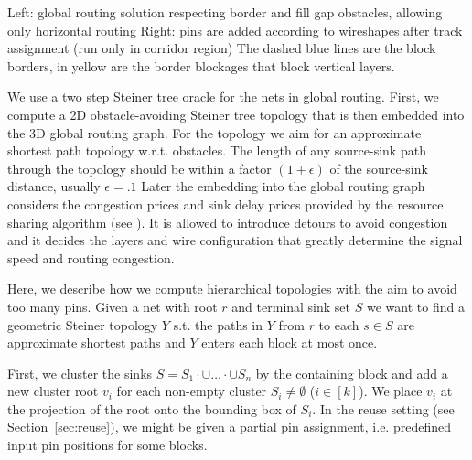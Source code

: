 \documentclass[a2paper]{bigsposter}
\begin{document}
\begin{blockrow}[3]
 {\footnotesize \begin{spacing}{0.9}
 		Left: global routing solution respecting border and fill gap obstacles, allowing only horizontal routing
 		Right: pins are added according to wireshapes after track assignment (run only in corridor region)
 		The dashed blue lines are the block borders, in yellow are the border blockages that block vertical layers.
 	\end{spacing}	}
 
 	
	\blockbreak
	We use a two step Steiner tree oracle for the nets in  global routing.
	First, we compute a 2D obstacle-avoiding Steiner tree topology  that is then embedded into the 3D global routing graph.
	For the topology  we aim  for an approximate shortest path topology w.r.t. obstacles. The length of any source-sink path through the topology
	should be within a factor $(1+\epsilon)$ of the source-sink distance, usually $\epsilon=.1$ 
	Later the embedding into the global routing graph considers the congestion prices and sink delay prices provided by the resource sharing algorithm (see \cite{BRGTiming2}).
	It is allowed to  introduce detours to avoid congestion and it decides the  layers and wire configuration that greatly determine the signal speed and routing congestion.
	
	Here, we describe how we compute hierarchical topologies with the aim to avoid too many pins.
	Given  a net with root $r$ and terminal sink set $S$ we want to find a geometric Steiner topology $Y$ s.t.
	the paths in $Y$ from $r$ to each $s\in S$  are  approximate shortest paths and $Y$ enters each block at most once.
	
	First, we cluster the sinks $S = S_1\cdot{\cup}\dots\cdot{\cup} S_n$ by the containing block and add a new cluster root $v_i$ for each non-empty cluster $S_i \neq\emptyset$ ($i\in [k]$).
	We place  $v_i$ at  the projection of the root onto the bounding box of $S_i$. 
	In the reuse setting (see Section~\ref{sec:reuse}), we might be given a partial pin assignment, i.e. predefined input pin positions for some blocks. %
	

\end{blockrow}
\end{document}

